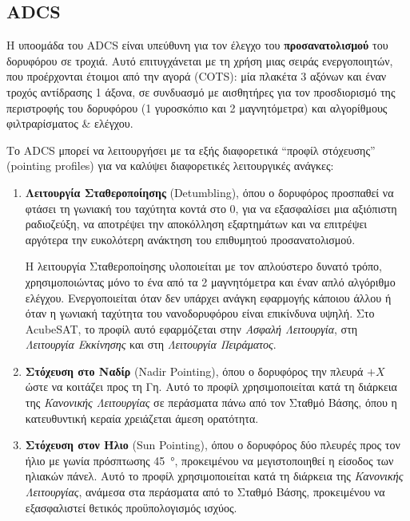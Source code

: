 \documentclass[a4paper,nobib]{tufte-book}
\begin{document}
\subsection{\acf{ADCS}}
\label{sec:adcs}

Η υποομάδα του \ac{ADCS} είναι υπεύθυνη για τον έλεγχο του \textbf{προσανατολισμού} του δορυφόρου σε τροχιά. Αυτό επιτυγχάνεται με τη χρήση μιας σειράς ενεργοποιητών, που προέρχονται έτοιμοι από την αγορά (\ac{COTS}): μία πλακέτα 3 αξόνων και έναν τροχός αντίδρασης 1 άξονα, σε συνδυασμό με αισθητήρες για τον προσδιορισμό της περιστροφής του δορυφόρου (1 γυροσκόπιο και 2 μαγνητόμετρα) και αλγορίθμους φιλτραρίσματος \& ελέγχου. \autocite{DDJF_AOCS,velentzas_design_attitude_2021}

Το \ac{ADCS} μπορεί να λειτουργήσει με τα εξής διαφορετικά ``προφίλ στόχευσης'' (pointing profiles) για να καλύψει διαφορετικές λειτουργικές ανάγκες:
\begin{enumerate}
	\item \textbf{Λειτουργία Σταθεροποίησης} (Detumbling), όπου ο δορυφόρος προσπαθεί να φτάσει τη γωνιακή του ταχύτητα κοντά στο 0, για να εξασφαλίσει μια αξιόπιστη ραδιοζεύξη, να αποτρέψει την αποκόλληση εξαρτημάτων και να επιτρέψει αργότερα την ευκολότερη ανάκτηση του επιθυμητού προσανατολισμού.
	
	Η λειτουργία Σταθεροποίησης υλοποιείται με τον απλούστερο δυνατό τρόπο, χρησιμοποιώντας μόνο το ένα από τα 2 μαγνητόμετρα και έναν απλό αλγόριθμο ελέγχου. Ενεργοποιείται όταν δεν υπάρχει ανάγκη εφαρμογής κάποιου άλλου ή όταν η γωνιακή ταχύτητα του νανοδορυφόρου είναι επικίνδυνα υψηλή. Στο AcubeSAT, το προφίλ αυτό εφαρμόζεται στην \emph{Ασφαλή Λειτουργία}, στη \emph{Λειτουργία Εκκίνησης} και στη \emph{Λειτουργία Πειράματος}.
	
	\item \textbf{Στόχευση στο Ναδίρ} (Nadir Pointing), όπου ο δορυφόρος  την πλευρά \(+X\) ώστε να κοιτάζει προς τη Γη. Αυτό το προφίλ χρησιμοποιείται κατά τη διάρκεια της \emph{Κανονικής Λειτουργίας} σε περάσματα πάνω από τον Σταθμό Βάσης, όπου η κατευθυντική κεραία χρειάζεται άμεση ορατότητα.
	
	\item \textbf{Στόχευση στον Ήλιο} (Sun Pointing), όπου ο δορυφόρος  δύο πλευρές προς τον ήλιο με γωνία πρόσπτωσης \SI{45}{\degree}, προ\-κει\-μέ\-νου να μεγιστοποιηθεί η είσοδος των ηλιακών πάνελ. Αυτό το προφίλ χρησιμοποιείται κατά τη διάρκεια της \emph{Κανονικής Λειτουργίας}, ανάμεσα στα περάσματα από το Σταθμό Βάσης, προκειμένου να εξασφαλιστεί θετικός προϋπολογισμός ισχύος.
\end{enumerate}
\end{document}
